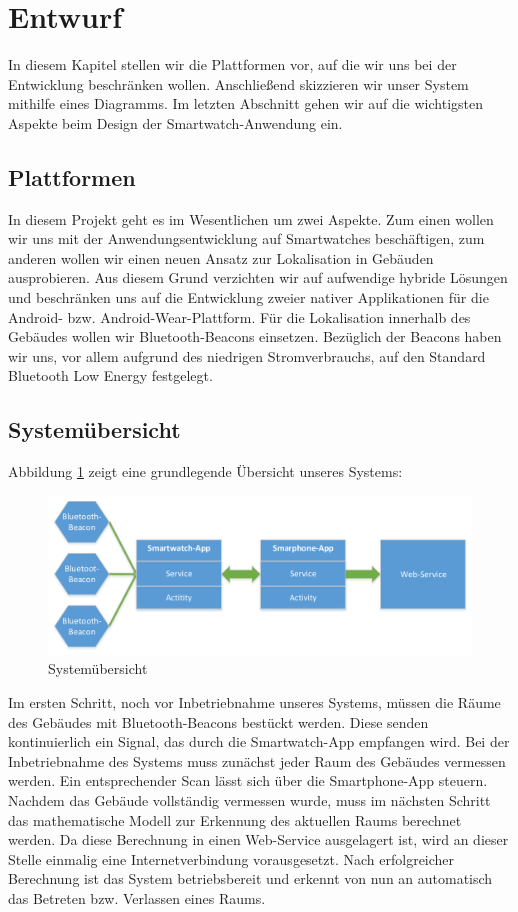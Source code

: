 \section{Entwurf}
In diesem Kapitel stellen wir die Plattformen vor, auf die wir uns bei der Entwicklung beschränken wollen. Anschließend skizzieren wir unser System mithilfe eines Diagramms. Im letzten Abschnitt gehen wir auf die wichtigsten Aspekte beim Design der Smartwatch-Anwendung ein.

\subsection{Plattformen}
In diesem Projekt geht es im Wesentlichen um zwei Aspekte. Zum einen wollen wir uns mit der Anwendungsentwicklung auf Smartwatches beschäftigen, zum anderen wollen wir einen neuen Ansatz zur Lokalisation in Gebäuden ausprobieren. Aus diesem Grund verzichten wir auf aufwendige hybride Lösungen und beschränken uns auf die Entwicklung zweier nativer Applikationen für die Android- bzw. Android-Wear-Plattform. Für die Lokalisation innerhalb des Gebäudes wollen wir Bluetooth-Beacons einsetzen. Bezüglich der Beacons haben wir uns, vor allem aufgrund des niedrigen Stromverbrauchs, auf den Standard Bluetooth Low Energy festgelegt.

\subsection{Systemübersicht}
\label{sec:systemuebersicht}
Abbildung \ref{fig:Übersicht} zeigt eine grundlegende Übersicht unseres Systems:

\begin{figure}[H]
\centering
\includegraphics[width=0.95\linewidth]{Bilder/Uebersicht}
\caption{Systemübersicht}
\label{fig:Übersicht}
\end{figure}

Im ersten Schritt, noch vor Inbetriebnahme unseres Systems, müssen die Räume des Gebäudes mit Bluetooth-Beacons bestückt werden. Diese senden kontinuierlich ein Signal, das durch die Smartwatch-App empfangen wird. Bei der Inbetriebnahme des Systems muss zunächst jeder Raum des Gebäudes vermessen werden. Ein entsprechender Scan lässt sich über die Smartphone-App steuern. Nachdem das Gebäude vollständig vermessen wurde, muss im nächsten Schritt das mathematische Modell zur Erkennung des aktuellen Raums berechnet werden. Da diese Berechnung in einen Web-Service ausgelagert ist, wird an dieser Stelle einmalig eine Internetverbindung vorausgesetzt. Nach erfolgreicher Berechnung ist das System betriebsbereit und erkennt von nun an automatisch das Betreten bzw. Verlassen eines Raums.

